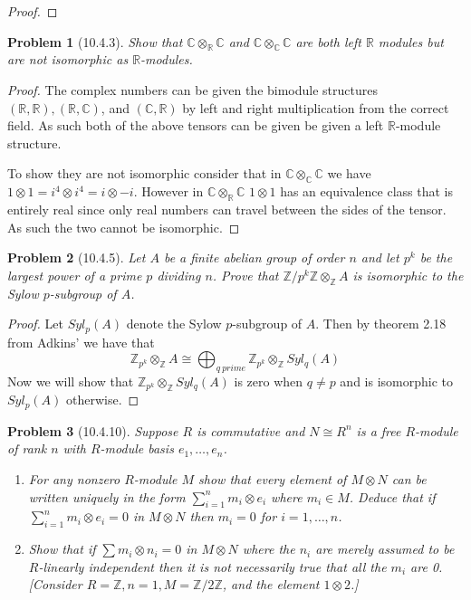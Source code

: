 \documentclass[10pt]{article}
\newcommand{\sk}{\vskip 10mm}
\newcommand{\bb}[1]{\mathbb{#1}}
\theoremstyle{plain}
\newtheorem{problem}{Problem}
\theoremstyle{remark}
\begin{document}
\begin{proof}
  
\end{proof}

\sk

\begin{problem}[10.4.3]
  Show that $\bb{C}\otimes_{\bb{R}}\bb{C}$ and $\bb{C}\otimes_{\bb{C}}\bb{C}$
  are both left $\bb{R}$ modules but are not isomorphic as $\bb{R}$-modules.
\end{problem}

\begin{proof}
  The complex numbers can be given the bimodule structures
  $(\bb{R},\bb{R}),(\bb{R},\bb{C})$, and $(\bb{C},\bb{R})$ by left
  and right multiplication from the correct field. As such both of the
  above tensors can be given be given a left $\bb{R}$-module structure.

  To show they are not isomorphic consider that in $\bb{C}\otimes_{\bb{C}}\bb{C}$
  we have $1\otimes 1=i^4\otimes i^4=i\otimes -i$. However in $\bb{C}\otimes_{\bb{R}}\bb{C}$
  $1\otimes 1$ has an equivalence class that is entirely real since only real numbers
  can travel between the sides of the tensor. As such the two cannot be
  isomorphic.
\end{proof}

\sk

\begin{problem}[10.4.5]
  Let $A$ be a finite abelian group of order $n$ and let $p^k$ be the largest
  power of a prime $p$ dividing $n$. Prove that
  $\bb{Z}/p^k\bb{Z}\otimes_{\bb{Z}}A$ is isomorphic to the Sylow $p$-subgroup
  of $A$.
\end{problem}

\begin{proof}
  Let $Syl_p(A)$ denote the Sylow $p$-subgroup of $A$. Then by theorem
  2.18 from Adkins' we have that
  \[
    \bb{Z}_{p^k}\otimes_{\bb{Z}} A \cong \bigoplus_{q\ prime}\bb{Z}_{p^k}\otimes_{\bb{Z}} Syl_q(A)
  \]
  Now we will show that $\bb{Z}_{p^k}\otimes_{\bb{Z}}Syl_q(A)$ is zero when
  $q\neq p$ and is isomorphic to $Syl_p(A)$ otherwise.
\end{proof}

\sk

\begin{problem}[10.4.10]
  Suppose $R$ is commutative and $N\cong R^n$ is a free $R$-module of rank
  $n$ with $R$-module basis $e_1,\ldots,e_n$.
  \begin{enumerate}
  \item[(a)] For any nonzero $R$-module $M$ show that every element
    of $M\otimes N$ can be written uniquely in the form
    $\sum_{i=1}^n m_i\otimes e_i$ where $m_i\in M$. Deduce that if
    $\sum_{i=1}^nm_i\otimes e_i=0$ in $M\otimes N$ then $m_i=0$ for
    $i=1,\ldots,n$.
  \item[(b)] Show that if $\sum m_i\otimes n_i=0$ in $M\otimes N$ where the
    $n_i$ are merely assumed to be $R$-linearly independent then it is not
    necessarily true that all the $m_i$ are 0. [Consider
    $R=\bb{Z},n=1,M=\bb{Z}/2\bb{Z}$, and the element $1\otimes 2$.]
  \end{enumerate}
\end{problem}
\end{document}
